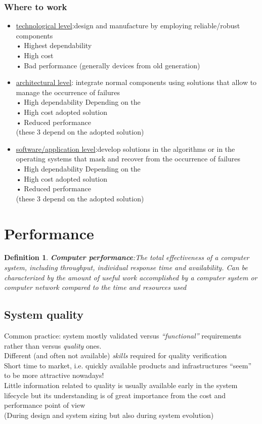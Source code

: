 \documentclass[10pt, oneside]{article}
\newtheorem{defn}{Definition}
\begin{document}
\subsubsection{Where to work}
\begin{itemize}
    \item \underline{technological level}:design and manufacture by employing reliable/robust components\\• Highest dependability\\
    • High cost\\
    • Bad performance (generally devices from old generation)
    \item \underline{architectural level}: integrate normal components using solutions that allow to manage the occurrence of failures\\
    • High dependability
    Depending on the\\ • High cost adopted solution\\
    • Reduced performance\\(these 3 depend on the adopted solution)
    \item \underline{software/application level}:develop solutions in the algorithms or in the operating systems that mask and recover from the occurrence of failures\\
    • High dependability
    Depending on the\\ • High cost adopted solution\\
    • Reduced performance\\(these 3 depend on the adopted solution)
\end{itemize}
\newpage
\section{Performance}
\begin{defn}
    {\bf Computer performance}:The total effectiveness of a computer system, including
    throughput, individual response time and availability. Can be characterized by the amount of useful work accomplished by a computer system or computer network compared to the time and resources used
\end{defn}
\subsection{System quality}
Common practice: system mostly validated versus {\sl “functional”} requirements rather than versus {\sl quality} ones.\\
Different (and often not available) {\sl skills} required for quality verification\\
Short time to market, i.e. quickly available products and infrastructures “seem” to be more attractive nowadays!\\
Little information related to quality is usually available early in the system lifecycle but its understanding is of great importance from the cost and performance point of view\\(During design and system sizing
but also during system evolution)
\end{document}

